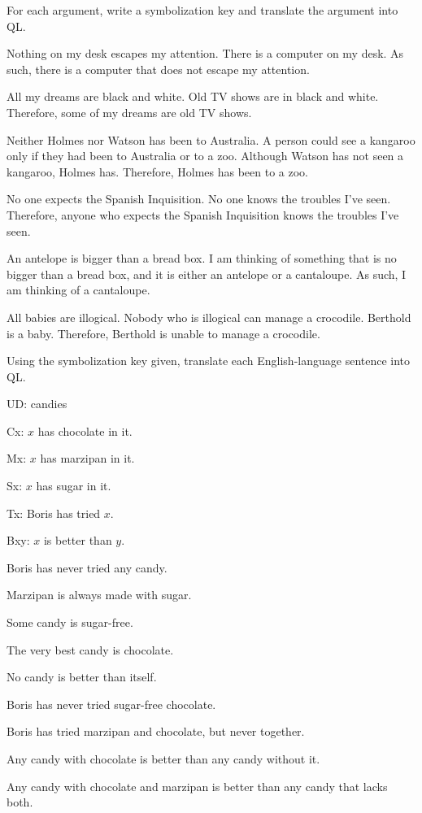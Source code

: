 \problempart
\label{pr.QLarguments}
For each argument, write a symbolization key and translate the argument into QL.
\begin{earg}
\item Nothing on my desk escapes my attention. There is a computer on my desk. As such, there is a computer that does not escape my attention.
\item All my dreams are black and white. Old TV shows are in black and white. Therefore, some of my dreams are old TV shows.
\item Neither Holmes nor Watson has been to Australia. A person could see a kangaroo only if they had been to Australia or to a zoo. Although Watson has not seen a kangaroo, Holmes has. Therefore, Holmes has been to a zoo.
\item No one expects the Spanish Inquisition. No one knows the troubles I've seen. Therefore, anyone who expects the Spanish Inquisition knows the troubles I've seen.
\item An antelope is bigger than a bread box. I am thinking of something that is no bigger than a bread box, and it is either an antelope or a cantaloupe. As such, I am thinking of a cantaloupe.
\item All babies are illogical. Nobody who is illogical can manage a crocodile. Berthold is a baby. Therefore, Berthold is unable to manage a crocodile.
\end{earg}

\solutions
\problempart
\label{pr.QLcandies}
Using the symbolization key given, translate each English-language sentence into QL.
\begin{ekey}
\item[UD:] candies
\item[Cx:] $x$ has chocolate in it.
\item[Mx:] $x$ has marzipan in it.
\item[Sx:] $x$ has sugar in it.
\item[Tx:] Boris has tried $x$.
\item[Bxy:] $x$ is better than $y$.
\end{ekey}
\begin{earg}
\item Boris has never tried any candy.
\item Marzipan is always made with sugar.
\item Some candy is sugar-free.
\item The very best candy is chocolate.
\item No candy is better than itself.
\item Boris has never tried sugar-free chocolate.
\item Boris has tried marzipan and chocolate, but never together.
\item Any candy with chocolate is better than any candy without it.
\item Any candy with chocolate and marzipan is better than any candy that lacks both.
\end{earg}



